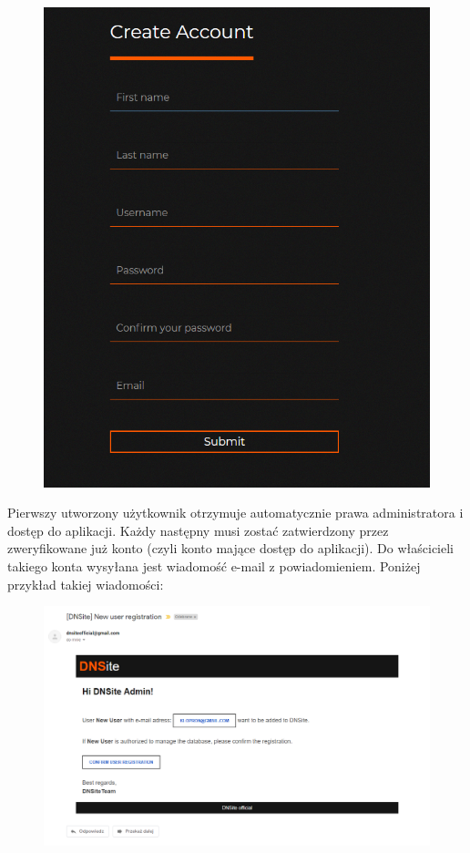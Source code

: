 \documentclass[12pt] {article}
\begin{document}
\begin{figure}[H]
\centering
\includegraphics[scale=0.5]{res/3_rejestracja}
\end{figure}
Pierwszy utworzony użytkownik otrzymuje automatycznie prawa administratora i dostęp do aplikacji. Każdy następny musi zostać zatwierdzony przez zweryfikowane już konto (czyli konto mające dostęp do aplikacji). Do właścicieli takiego konta wysyłana jest wiadomość e-mail z powiadomieniem. Poniżej przykład takiej wiadomości:
\begin{figure}[H]
\centering
\includegraphics[width=\textwidth]{res/x_mail_potwierdzenie}
\end{figure}
\end{document}
